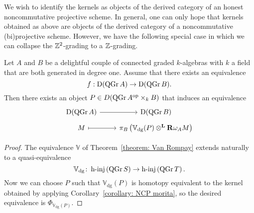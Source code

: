 We wish to identify the kernels as objects of the derived category of an honest noncommutative projective scheme.
In general, one can only hope that kernels obtained as above are objects of the derived category of a noncommutative (bi)projective scheme.
However, we have the following special case in which we can collapse the \(\mathbb{Z}^2\)-grading to a \(\mathbb{Z}\)-grading.

\begin{corollary} \label{corollary: NCP morita degree 1}
  Let \(A\) and \(B\) be a delightful couple of connected graded \(k\)-algebras with \(k\) a field that are both generated in degree one.
  Assume that there exists an equivalence
  \begin{displaymath}
    f : \mathrm{D} (\operatorname{QGr}A) \to \mathrm{D} (\operatorname{QGr}B).
  \end{displaymath}
  Then there exists an object \(P \in D ( \operatorname{QGr}A^{\operatorname{op}} \times_k B )\) that induces an equivalence
  \[\begin{tikzcd}[row sep=tiny]
  \mathrm{D}(\QGr{A}) \arrow{r}& \mathrm{D}(\QGr{B})\\
  M \arrow[mapsto]{r} & \pi_B\left(\mathbb{V}_\text{dg}(P) \otimes^\mathbf{L} \mathbf{R}\omega_A M\right)
  \end{tikzcd}\]
\end{corollary}

\begin{proof}
  The equivalence \(\mathbb{V}\) of Theorem~\ref{theorem: Van Rompay} extends naturally to a quasi-equivalence
  \[\mathbb{V}_\text{dg} \colon \operatorname{h-inj}\left(\operatorname{QGr}S\right) \to \operatorname{h-inj}\left(\operatorname{QGr}T\right).\]
  Now we can choose \(P\) such that \(\mathbb{V}_\text{dg}(P)\) is homotopy equivalent to the kernel obtained by applying Corollary~\ref{corollary: NCP morita}, so the desired equivalence is \(\Phi_{\mathbb{V}_\text{dg}(P)}\).
\end{proof}
